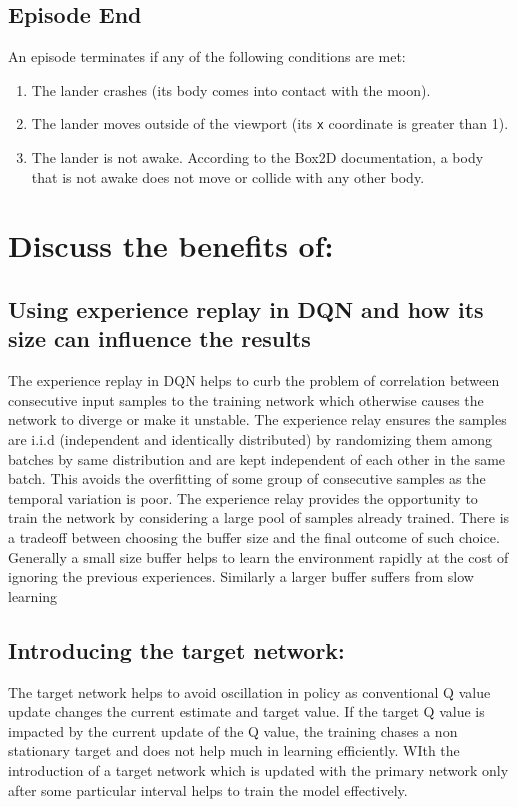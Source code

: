 \documentclass{article} %
\begin{document}
\subsection{Episode End}
An episode terminates if any of the following conditions are met: \begin{enumerate} \item The lander crashes (its body comes into contact with the moon). \item The lander moves outside of the viewport (its \verb|x| coordinate is greater than 1). \item The lander is not awake. According to the Box2D documentation, a body that is not awake does not move or collide with any other body. \end{enumerate}

\section{Discuss the benefits of:}
\subsection{Using experience replay in DQN and how its size can influence the results}

The experience replay in DQN helps to curb the problem of correlation between consecutive input samples to the training network which otherwise causes the network to diverge or make it unstable. The experience relay ensures the samples are i.i.d (independent and identically distributed) by randomizing them among batches by same distribution and are kept independent of each other in the same batch. This avoids the overfitting of some group of consecutive samples as the temporal variation is poor. 
The experience relay provides the opportunity to train the network by considering a large pool of samples already trained. There is a tradeoff between choosing the buffer size and the final outcome of such choice. Generally a small size buffer helps to learn the environment rapidly at the cost of ignoring the previous experiences. Similarly a larger buffer suffers from slow learning 

\subsection{Introducing the target network:}
The target network helps to avoid oscillation in policy as conventional Q value update changes the current estimate and target value. If the target Q value is impacted by the current update of the Q value, the training chases a non stationary target and does not help much in learning efficiently. WIth the introduction of a target network which is updated with the primary network only after some particular interval  helps to train the model effectively.
\end{document}
